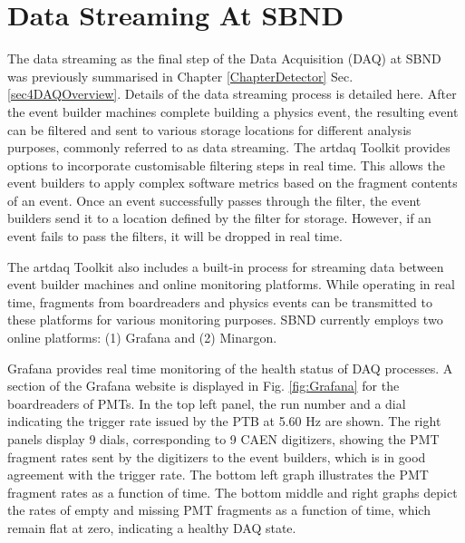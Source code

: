 \chapter{Data Streaming At SBND} 
\label{appendix_data_stream}
\ifpdf
    \graphicspath{{Appendix2/Figs/Raster/}{Appendix2/Figs/PDF/}{Appendix2/Figs/}}
\else
    \graphicspath{{Appendix2/Figs/Vector/}{Appendix2/Figs/}}
\fi

The data streaming as the final step of the Data Acquisition (DAQ) at SBND was previously summarised in Chapter \ref{ChapterDetector} Sec.  \ref{sec4DAQOverview}.
Details of the data streaming process is detailed here.
After the event builder machines complete building a physics event, the resulting event can be filtered and sent to various storage locations for different analysis purposes, commonly referred to as data streaming.
The artdaq Toolkit provides options to incorporate customisable filtering steps in real time. 
This allows the event builders to apply complex software metrics based on the fragment contents of an event. 
Once an event successfully passes through the filter, the event builders send it to a location defined by the filter for storage. 
However, if an event fails to pass the filters, it will be dropped in real time.

The artdaq Toolkit also includes a built-in process for streaming data between event builder machines and online monitoring platforms.
While operating in real time, fragments from boardreaders and physics events can be transmitted to these platforms for various monitoring purposes. 
SBND currently employs two online platforms: (1) Grafana and (2) Minargon.

Grafana provides real time monitoring of the health status of DAQ processes. 
A section of the Grafana website is displayed in Fig. \ref{fig:Grafana} for the boardreaders of PMTs.
In the top left panel, the run number and a dial indicating the trigger rate issued by the PTB at 5.60 Hz are shown. 
The right panels display 9 dials, corresponding to 9 CAEN digitizers, showing the PMT fragment rates sent by the digitizers to the event builders, which is in good agreement with the trigger rate.
The bottom left graph illustrates the PMT fragment rates as a function of time. 
The bottom middle and right graphs depict the rates of empty and missing PMT fragments as a function of time, which remain flat at zero, indicating a healthy DAQ state.

